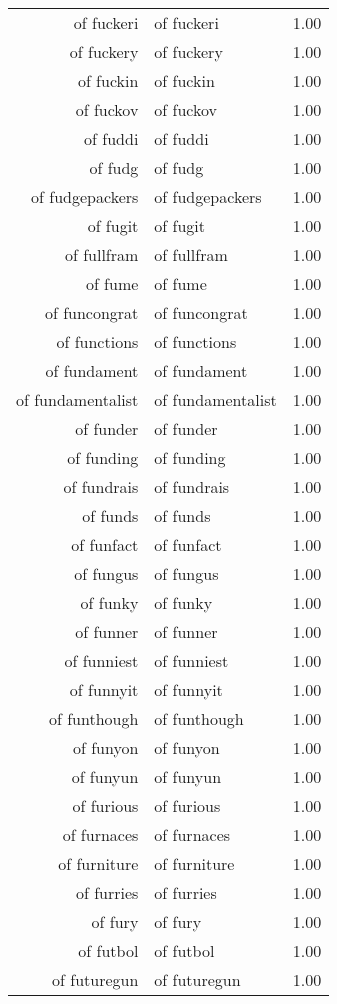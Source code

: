 \begin{table}[ht]
\begin{tabular}{rlr}
  of fuckeri & of fuckeri & 1.00 \\ 
  of fuckery & of fuckery & 1.00 \\ 
  of fuckin & of fuckin & 1.00 \\ 
  of fuckov & of fuckov & 1.00 \\ 
  of fuddi & of fuddi & 1.00 \\ 
  of fudg & of fudg & 1.00 \\ 
  of fudgepackers & of fudgepackers & 1.00 \\ 
  of fugit & of fugit & 1.00 \\ 
  of fullfram & of fullfram & 1.00 \\ 
  of fume & of fume & 1.00 \\ 
  of funcongrat & of funcongrat & 1.00 \\ 
  of functions & of functions & 1.00 \\ 
  of fundament & of fundament & 1.00 \\ 
  of fundamentalist & of fundamentalist & 1.00 \\ 
  of funder & of funder & 1.00 \\ 
  of funding & of funding & 1.00 \\ 
  of fundrais & of fundrais & 1.00 \\ 
  of funds & of funds & 1.00 \\ 
  of funfact & of funfact & 1.00 \\ 
  of fungus & of fungus & 1.00 \\ 
  of funky & of funky & 1.00 \\ 
  of funner & of funner & 1.00 \\ 
  of funniest & of funniest & 1.00 \\ 
  of funnyit & of funnyit & 1.00 \\ 
  of funthough & of funthough & 1.00 \\ 
  of funyon & of funyon & 1.00 \\ 
  of funyun & of funyun & 1.00 \\ 
  of furious & of furious & 1.00 \\ 
  of furnaces & of furnaces & 1.00 \\ 
  of furniture & of furniture & 1.00 \\ 
  of furries & of furries & 1.00 \\ 
  of fury & of fury & 1.00 \\ 
  of futbol & of futbol & 1.00 \\ 
  of futuregun & of futuregun & 1.00 \\ 

\end{tabular}
\end{table}
